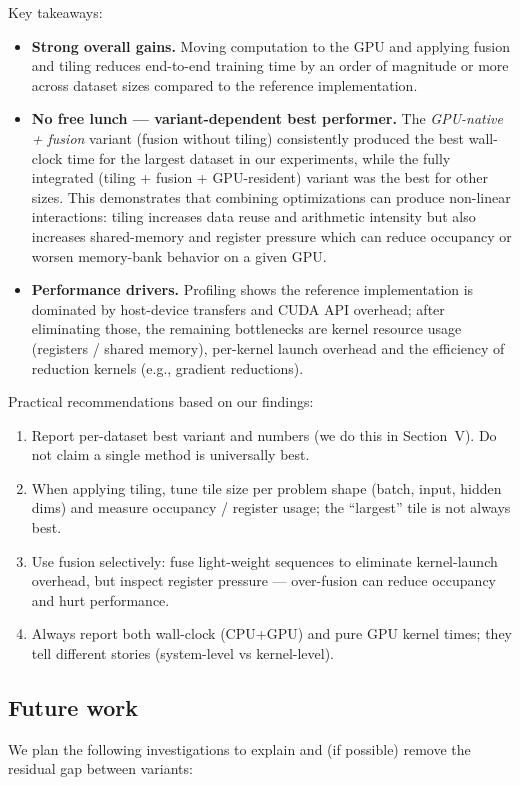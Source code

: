 \documentclass[conference, 12pt]{IEEEtran}
\begin{document}
Key takeaways:
\begin{itemize}
  \item \textbf{Strong overall gains.} Moving computation to the GPU and applying fusion and tiling reduces end-to-end training time by an order of magnitude or more across dataset sizes compared to the reference implementation.
  \item \textbf{No free lunch — variant-dependent best performer.} The \emph{GPU-native + fusion} variant (fusion without tiling) consistently produced the best wall-clock time for the largest dataset in our experiments, while the fully integrated (tiling + fusion + GPU-resident) variant was the best for other sizes. This demonstrates that combining optimizations can produce non-linear interactions: tiling increases data reuse and arithmetic intensity but also increases shared-memory and register pressure which can reduce occupancy or worsen memory-bank behavior on a given GPU.
  \item \textbf{Performance drivers.} Profiling shows the reference implementation is dominated by host-device transfers and CUDA API overhead; after eliminating those, the remaining bottlenecks are kernel resource usage (registers / shared memory), per-kernel launch overhead and the efficiency of reduction kernels (e.g., gradient reductions).
\end{itemize}

Practical recommendations based on our findings:
\begin{enumerate}
  \item Report per-dataset best variant and numbers (we do this in Section~V). Do not claim a single method is universally best.
  \item When applying tiling, tune tile size per problem shape (batch, input, hidden dims) and measure occupancy / register usage; the ``largest'' tile is not always best.
  \item Use fusion selectively: fuse light-weight sequences to eliminate kernel-launch overhead, but inspect register pressure — over-fusion can reduce occupancy and hurt performance.
  \item Always report both wall-clock (CPU+GPU) and pure GPU kernel times; they tell different stories (system-level vs kernel-level).
\end{enumerate}

\subsection*{Future work}
We plan the following investigations to explain and (if possible) remove the residual gap between variants:
\end{document}
